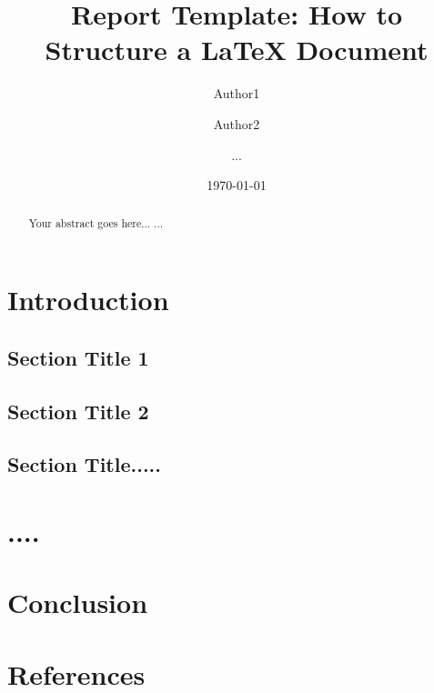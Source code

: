 \documentclass[11pt,a4paper]{report}
\begin{document}
\title{Report Template: How to Structure a LaTeX Document}
\author{Author1 \and Author2 \and ...}
\date{\today}
\maketitle

\begin{abstract}
Your abstract goes here...
...
\end{abstract}

\chapter{Introduction}
\section{Section Title 1}
\section{Section Title 2}
\section{Section Title.....}

\chapter{....}

\chapter{Conclusion}


\chapter*{References}
\end{document}
